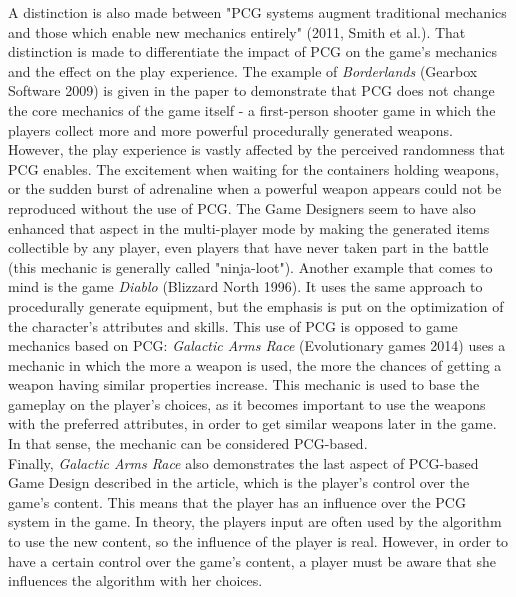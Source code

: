 A distinction is also made between "PCG systems augment traditional mechanics and those which enable new mechanics entirely" (2011, Smith et al.). That distinction is made to differentiate the impact of PCG on the game's mechanics and the effect on the play experience. The example of \textit{Borderlands} (Gearbox Software 2009) is given in the paper to demonstrate that PCG does not change the core mechanics of the game itself - a first-person shooter game in which the players collect more and more powerful procedurally generated weapons. However, the play experience is vastly affected by the perceived randomness that PCG enables. The excitement when waiting for the containers holding weapons, or the sudden burst of adrenaline when a powerful weapon appears could not be reproduced without the use of PCG. The Game Designers seem to have also enhanced that aspect in the multi-player mode by making the generated items collectible by any player, even players that have never taken part in the battle (this mechanic is generally called "ninja-loot"). Another example that comes to mind is the game \textit{Diablo} (Blizzard North 1996). It uses the same approach to procedurally generate equipment, but the emphasis is put on the optimization of the character's attributes and skills. This use of PCG is opposed to game mechanics based on PCG: \textit{Galactic Arms Race} (Evolutionary games 2014) uses a mechanic in which the more a weapon is used, the more the chances of getting a weapon having similar properties increase. This mechanic is used to base the gameplay on the player's choices, as it becomes important to use the weapons with the preferred attributes, in order to get similar weapons later in the game. In that sense, the mechanic can be considered PCG-based.\\
Finally, \textit{Galactic Arms Race} also demonstrates the last aspect of PCG-based Game Design described in the article, which is the player's control over the game's content. This means that the player has an influence over the PCG system in the game. In theory, the players input are often used by the algorithm to use the new content, so the influence of the player is real. However, in order to have a certain control over the game's content, a player must be aware that she influences the algorithm with her choices. 